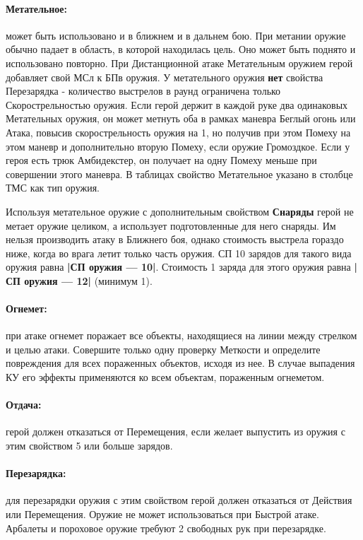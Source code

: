 \paragraph{Метательное:} может быть использовано и в ближнем и в дальнем бою. При метании оружие обычно падает в область, в которой находилась цель. Оно может быть поднято и использовано повторно. При Дистанционной атаке Метательным оружием герой добавляет свой МСл к БПв оружия. У метательного оружия \textbf{нет} свойства Перезарядка - количество выстрелов в раунд ограничена только Скорострельностью оружия. Если герой держит в каждой руке два одинаковых Метательных оружия, он может метнуть оба в рамках маневра Беглый огонь или Атака, повысив скорострельность оружия на 1, но получив при этом Помеху на этом маневр и дополнительно вторую Помеху, если оружие Громоздкое. Если у героя есть трюк Амбидекстер, он получает на одну Помеху меньше при совершении этого маневра. В таблицах свойство Метательное указано в столбце ТМС как тип оружия.
\begin{tcolorbox}
Используя метательное оружие с дополнительным свойством \textbf{Снаряды} герой не метает оружие целиком, а использует подготовленные для него снаряды. Им нельзя производить атаку в Ближнего боя, однако стоимость выстрела гораздо ниже, когда во врага летит только часть оружия. СП 10 зарядов для такого вида оружия равна \textbf{|СП оружия — 10|}. Стоимость 1 заряда для этого оружия равна \textbf{|СП оружия — 12|} (минимум 1).
\end{tcolorbox}
\paragraph{Огнемет:} при атаке огнемет поражает все объекты, находящиеся на линии между стрелком и целью атаки. Совершите только одну проверку Меткости и определите повреждения для всех пораженных объектов, исходя из нее. В случае выпадения КУ его эффекты применяются ко всем объектам, пораженным огнеметом.
\paragraph{Отдача:} герой должен отказаться от Перемещения, если желает выпустить из оружия с этим свойством 5 или больше зарядов.
\paragraph{Перезарядка:} для перезарядки оружия с этим свойством герой должен отказаться от Действия или Перемещения. Оружие не может использоваться при Быстрой атаке. Арбалеты и пороховое оружие требуют 2 свободных рук при перезарядке.
